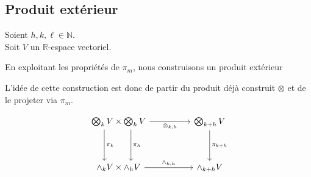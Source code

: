 \documentclass[../geometrie.tex]{subfiles}
\begin{document}
	\subsection{Produit extérieur}{
		\noindent Soient $h, k, \ell \in \mathbb{N}$. \\
		\noindent Soit $V$ un $\mathbb{R}$-espace vectoriel.

		\vspace{1em}

		En exploitant les propriétés de $\pi_{m}$, nous construisons un \flqq{} produit extérieur \frqq{}


		L'idée de cette construction est donc de partir du produit déjà construit $\otimes$ et de le projeter via $\pi_{m}$.

		$$
			\begin{tikzcd}
				{\bigotimes_{k} V \times \bigotimes_{h} V} && {\bigotimes_{k + h} V} \\
				\\
				{\wedge_{k} V \times \wedge_{h} V} && {\wedge_{k + h} V}
				\arrow["{\otimes_{k, h}}"', from=1-1, to=1-3]
				\arrow["{\pi_{k}}", from=1-1, to=3-1, shift right=7]
				\arrow["{\pi_{h}}", from=1-1, to=3-1, shift left=6]
				\arrow["{\pi_{k + h}}", from=1-3, to=3-3]
				\arrow["{\wedge_{k, h}}", from=3-1, to=3-3]
			\end{tikzcd}
		$$

}
\end{document}
